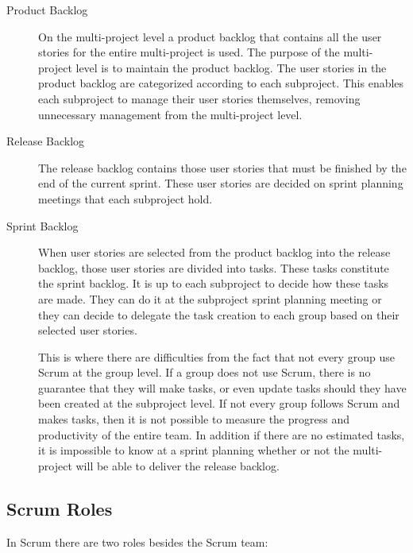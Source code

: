 \begin{description}

\item[Product Backlog]
On the multi-project level a product backlog that contains all the user stories for the entire multi-project is used. The purpose of the multi-project level is to maintain the product backlog. The user stories in the product backlog are categorized according to each subproject. This enables each subproject to manage their user stories themselves, removing unnecessary management from the multi-project level.

\item[Release Backlog]
The release backlog contains those user stories that must be finished by the end of the current sprint. These user stories are decided on sprint planning meetings that each subproject hold.

\item[Sprint Backlog]
When user stories are selected from the product backlog into the release backlog, those user stories are divided into tasks. These tasks constitute the sprint backlog. It is up to each subproject to decide how these tasks are made. They can do it at the subproject sprint planning meeting or they can decide to delegate the task creation to each group based on their selected user stories.

This is where there are difficulties from the fact that not every group use Scrum at the group level. If a group does not use Scrum, there is no guarantee that they will make tasks, or even update tasks should they have been created at the subproject level. If not every group follows Scrum and makes tasks, then it is not possible to measure the progress and productivity of the entire team. In addition if there are no estimated tasks, it is impossible to know at a sprint planning whether or not the multi-project will be able to deliver the release backlog.

\end{description}

\subsection{Scrum Roles}
In Scrum there are two roles besides the Scrum team:

